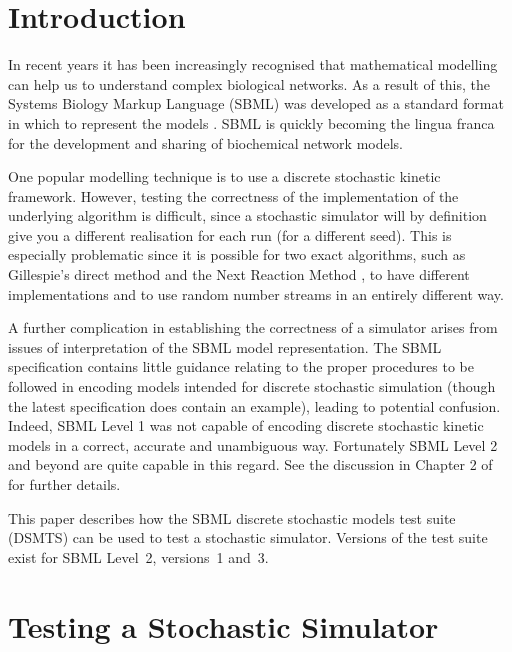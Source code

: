 \documentclass{bioinfo}
\begin{document}
\section{Introduction}

In recent years it has been increasingly recognised that mathematical
modelling can help us to understand complex biological networks. As a
result of this, the Systems Biology Markup Language (SBML) was
developed as a standard format in which to represent the models
\citep{Hucka03}. SBML is quickly becoming the lingua franca for the
development and sharing of biochemical network models.

One popular modelling technique is to use a discrete stochastic kinetic framework. However, testing the correctness of the implementation of the underlying algorithm is difficult, since a stochastic simulator will by definition give you a different realisation for each run (for a different seed). This is especially
problematic since it is possible for two exact algorithms, such as 
Gillespie's direct method \citep{Gillespie77} and the Next Reaction
Method \citep{GibsBruc00}, to have different implementations 
and to use random number streams in an entirely different way.

A further complication in establishing the correctness of a simulator
arises from issues of interpretation of the SBML model representation. 
The SBML specification contains little guidance relating to the proper 
procedures to be followed in encoding models intended for discrete 
stochastic simulation (though the latest specification does contain 
an example), leading to potential confusion. Indeed, SBML Level 1 
was not capable of encoding discrete stochastic kinetic models in a 
correct, accurate and unambiguous way. Fortunately SBML Level 2 
and beyond are quite capable in this regard. See the discussion in
Chapter 2 of \cite{Wilkinson06} for further details. 

This paper describes how the SBML discrete stochastic models test
suite (DSMTS) can be used to test a stochastic simulator. Versions of the test
suite exist for SBML Level~2, versions~1 and~3. 


\section{Testing a Stochastic Simulator}
\end{document}
